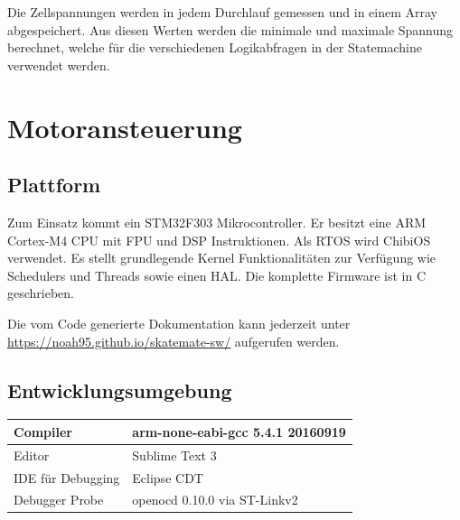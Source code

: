 Die Zellspannungen werden in jedem Durchlauf gemessen und in einem Array abgespeichert. Aus diesen Werten werden die minimale und maximale Spannung berechnet, welche für die verschiedenen Logikabfragen in der Statemachine verwendet werden.

\section{Motoransteuerung} \label{SW_Motoransteuerung}
\subsection*{Plattform}
Zum Einsatz kommt ein STM32F303 Mikrocontroller. Er besitzt eine ARM Cortex-M4 CPU mit FPU und DSP Instruktionen. Als RTOS wird ChibiOS verwendet. Es stellt grundlegende Kernel Funktionalitäten zur Verfügung wie Schedulers und Threads sowie einen HAL. Die komplette Firmware ist in C geschrieben.

Die vom Code generierte Dokumentation kann jederzeit unter \url{https://noah95.github.io/skatemate-sw/} aufgerufen werden.
\subsection*{Entwicklungsumgebung}
\begin{center}
	\begin{tabular}{ | l | l | }
		\hline
		Compiler & arm-none-eabi-gcc 5.4.1 20160919 \\ \hline
		Editor & Sublime Text 3 \\ \hline
		IDE für Debugging & Eclipse CDT \\ \hline
		Debugger Probe & openocd 0.10.0 via ST-Linkv2 \\ \hline
	\end{tabular}
\end{center}


